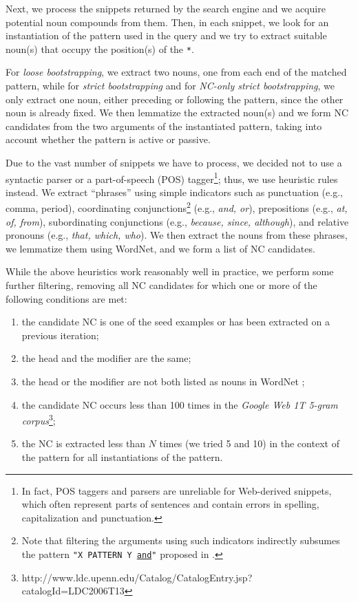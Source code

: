 \documentclass[letterpaper,11pt]{article}
\begin{document}
Next, we  process the snippets  returned by  the search engine  and we
acquire potential noun  compounds from them.
Then, in each  snippet, we look for  an instantiation
of the  pattern used  in the  query and  we try
to  extract  suitable  noun(s)  that occupy  the  position(s)  of  the
\texttt{*}.

For \emph{loose  bootstrapping}, we extract  two nouns, one  from each
end of the matched pattern,  while for \emph{strict bootstrapping} and
for  \emph{NC-only strict  bootstrapping}, we  only extract  one noun,
either preceding  or following  the pattern, since  the other  noun is
already fixed. We then lemmatize the  extracted noun(s) and
we  form  NC candidates  from  the  two arguments  of  the
instantiated  pattern,  taking into  account  whether  the pattern  is
active or passive.

Due  to  the   vast  number  of  snippets  we  have   to  process,  we
decided not to use a  syntactic parser  or a  part-of-speech (POS)
tagger\footnote{In  fact,  POS  taggers  and  parsers  are  unreliable
for  Web-derived snippets,  which often  represent parts  of sentences
and  contain errors  in  spelling,  capitalization and  punctuation.};
thus, we  use   heuristic  rules  instead.  We   extract  ``phrases''  using
simple  indicators   such  as   punctuation  (e.g.,   comma,  period),
coordinating conjunctions\footnote{Note  that filtering  the arguments
using  such  indicators  indirectly subsumes  the  pattern  \texttt{"X
PATTERN Y \underline{and}"}  proposed in \cite{Kozareva:2010}.} (e.g.,
\textit{and,  or}),   prepositions  (e.g.,  \textit{at,   of,  from}),
subordinating conjunctions (e.g.,  \textit{because, since, although}),
and  relative  pronouns (e.g.,  \textit{that,  which,  who}). We  then
extract the nouns from these phrases, we lemmatize them using WordNet,
and we form a list of NC candidates.

While the above heuristics work reasonably well in practice,
we perform some further filtering, removing all NC candidates
for which one or more of the following conditions are met:

\begin{enumerate}
\item the candidate NC is one of the seed examples or has been extracted on a previous iteration;
\item the head and the modifier are the same;
\item the head or the modifier are not both listed as nouns in WordNet \cite{Fellbaum:1998};
\item the candidate NC occurs less than 100 times in the \emph{Google Web 1T 5-gram corpus}\footnote{http://www.ldc.upenn.edu/Catalog/CatalogEntry.jsp?\\catalogId=LDC2006T13};
\item the NC is extracted less than $N$ times (we tried 5 and 10) in the context of the pattern for all instantiations of the pattern.
\end{enumerate}
\end{document}
